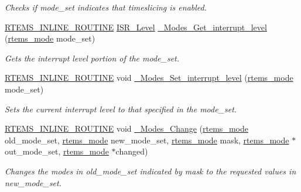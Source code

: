 \begin{DoxyCompactItemize}
\begin{DoxyCompactList}\small\item\em Checks if mode\+\_\+set indicates that timeslicing is enabled. \end{DoxyCompactList}\item 
\mbox{\hyperlink{group__RTEMSScoreBaseDefs_gac216239df231d5dbd15e3520b0b9313f}{R\+T\+E\+M\+S\+\_\+\+I\+N\+L\+I\+N\+E\+\_\+\+R\+O\+U\+T\+I\+NE}} \mbox{\hyperlink{group__RTEMSScoreISR_gad1af728587ebcefec5b5cf94fc7909b9}{I\+S\+R\+\_\+\+Level}} \mbox{\hyperlink{group__ClassicModesImpl_ga3badf3f95421e122383aa0a5ffed70b7}{\+\_\+\+Modes\+\_\+\+Get\+\_\+interrupt\+\_\+level}} (\mbox{\hyperlink{group__ClassicModes_ga8d46a41a837840dc97336fdcd20e4f68}{rtems\+\_\+mode}} mode\+\_\+set)
\begin{DoxyCompactList}\small\item\em Gets the interrupt level portion of the mode\+\_\+set. \end{DoxyCompactList}\item 
\mbox{\hyperlink{group__RTEMSScoreBaseDefs_gac216239df231d5dbd15e3520b0b9313f}{R\+T\+E\+M\+S\+\_\+\+I\+N\+L\+I\+N\+E\+\_\+\+R\+O\+U\+T\+I\+NE}} void \mbox{\hyperlink{group__ClassicModesImpl_ga0fa0003793c7e73766faa9e5195c0070}{\+\_\+\+Modes\+\_\+\+Set\+\_\+interrupt\+\_\+level}} (\mbox{\hyperlink{group__ClassicModes_ga8d46a41a837840dc97336fdcd20e4f68}{rtems\+\_\+mode}} mode\+\_\+set)
\begin{DoxyCompactList}\small\item\em Sets the current interrupt level to that specified in the mode\+\_\+set. \end{DoxyCompactList}\item 
\mbox{\hyperlink{group__RTEMSScoreBaseDefs_gac216239df231d5dbd15e3520b0b9313f}{R\+T\+E\+M\+S\+\_\+\+I\+N\+L\+I\+N\+E\+\_\+\+R\+O\+U\+T\+I\+NE}} void \mbox{\hyperlink{group__ClassicModesImpl_gae1c92cd554eae72a503e0209dfe6c620}{\+\_\+\+Modes\+\_\+\+Change}} (\mbox{\hyperlink{group__ClassicModes_ga8d46a41a837840dc97336fdcd20e4f68}{rtems\+\_\+mode}} old\+\_\+mode\+\_\+set, \mbox{\hyperlink{group__ClassicModes_ga8d46a41a837840dc97336fdcd20e4f68}{rtems\+\_\+mode}} new\+\_\+mode\+\_\+set, \mbox{\hyperlink{group__ClassicModes_ga8d46a41a837840dc97336fdcd20e4f68}{rtems\+\_\+mode}} mask, \mbox{\hyperlink{group__ClassicModes_ga8d46a41a837840dc97336fdcd20e4f68}{rtems\+\_\+mode}} $\ast$out\+\_\+mode\+\_\+set, \mbox{\hyperlink{group__ClassicModes_ga8d46a41a837840dc97336fdcd20e4f68}{rtems\+\_\+mode}} $\ast$changed)
\begin{DoxyCompactList}\small\item\em Changes the modes in old\+\_\+mode\+\_\+set indicated by mask to the requested values in new\+\_\+mode\+\_\+set. \end{DoxyCompactList}\end{DoxyCompactItemize}


